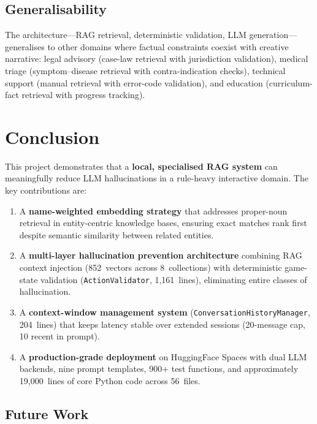 \documentclass[12pt,a4paper]{article}
\begin{document}
\subsection{Generalisability}

The architecture---RAG retrieval, deterministic validation, LLM
generation---generalises to other domains where factual constraints coexist
with creative narrative: legal advisory (case-law retrieval with
jurisdiction validation), medical triage (symptom--disease retrieval with
contra-indication checks), technical support (manual retrieval with
error-code validation), and education (curriculum-fact retrieval with
progress tracking).

\section{Conclusion}
\label{sec:conclusion}

This project demonstrates that a \textbf{local, specialised RAG system} can
meaningfully reduce LLM hallucinations in a rule-heavy interactive domain.
The key contributions are:

\begin{enumerate}[noitemsep]
    \item A \textbf{name-weighted embedding strategy} that addresses
          proper-noun retrieval in entity-centric knowledge bases, ensuring
          exact matches rank first despite semantic similarity between related
          entities.
    \item A \textbf{multi-layer hallucination prevention architecture}
          combining RAG context injection (852~vectors across
          8~collections) with deterministic game-state validation
          (\texttt{ActionValidator}, 1,161~lines), eliminating entire classes
          of hallucination.
    \item A \textbf{context-window management system}
          (\texttt{ConversationHistoryManager}, 204~lines) that keeps latency
          stable over extended sessions (20-message cap, 10 recent in prompt).
    \item A \textbf{production-grade deployment} on HuggingFace Spaces with
          dual LLM backends, nine prompt templates, 900+ test functions, and
          approximately 19,000~lines of core Python code across 56~files.
\end{enumerate}

\subsection{Future Work}
\end{document}
